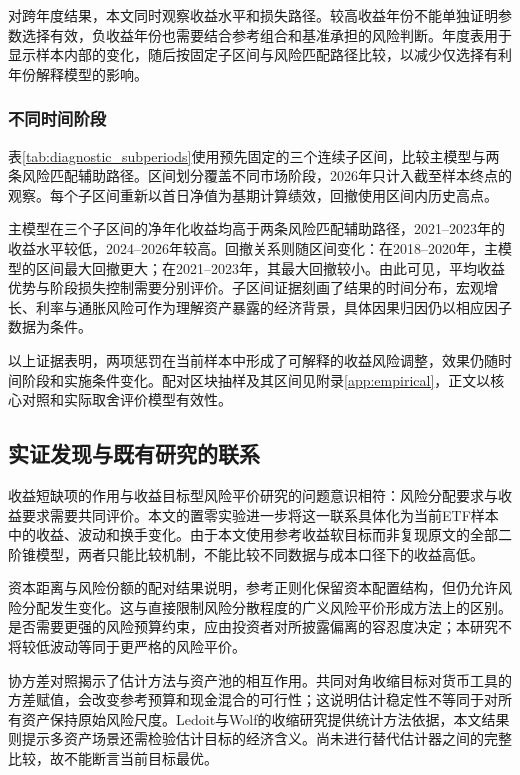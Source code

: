 对跨年度结果，本文同时观察收益水平和损失路径。较高收益年份不能单独证明参数选择有效，负收益年份也需要结合参考组合和基准承担的风险判断。年度表用于显示样本内部的变化，随后按固定子区间与风险匹配路径比较，以减少仅选择有利年份解释模型的影响。

\subsubsection{不同时间阶段}
表\ref{tab:diagnostic_subperiods}使用预先固定的三个连续子区间，比较主模型与两条风险匹配辅助路径。区间划分覆盖不同市场阶段，2026年只计入截至样本终点的观察。每个子区间重新以首日净值为基期计算绩效，回撤使用区间内历史高点。

\begin{table}[htbp]\centering
\caption{固定子区间中的收益、夏普与回撤}\label{tab:diagnostic_subperiods}
\fitthesistable{}
\end{table}

主模型在三个子区间的净年化收益均高于两条风险匹配辅助路径，2021--2023年的收益水平较低，2024--2026年较高。回撤关系则随区间变化：在2018--2020年，主模型的区间最大回撤更大；在2021--2023年，其最大回撤较小。由此可见，平均收益优势与阶段损失控制需要分别评价。子区间证据刻画了结果的时间分布，宏观增长、利率与通胀风险可作为理解资产暴露的经济背景，具体因果归因仍以相应因子数据为条件。
\FloatBarrier


以上证据表明，两项惩罚在当前样本中形成了可解释的收益风险调整，效果仍随时间阶段和实施条件变化。配对区块抽样及其区间见附录\ref{app:empirical}，正文以核心对照和实际取舍评价模型有效性。

\subsection{实证发现与既有研究的联系}
收益短缺项的作用与收益目标型风险平价研究的问题意识相符\cite{gambeta2020risk}：风险分配要求与收益要求需要共同评价。本文的置零实验进一步将这一联系具体化为当前ETF样本中的收益、波动和换手变化。由于本文使用参考收益软目标而非复现原文的全部二阶锥模型，两者只能比较机制，不能比较不同数据与成本口径下的收益高低。

资本距离与风险份额的配对结果说明，参考正则化保留资本配置结构，但仍允许风险分配发生变化。这与直接限制风险分散程度的广义风险平价形成方法上的区别\cite{costa2020generalized}。是否需要更强的风险预算约束，应由投资者对所披露偏离的容忍度决定；本研究不将较低波动等同于更严格的风险平价。

协方差对照揭示了估计方法与资产池的相互作用。共同对角收缩目标对货币工具的方差赋值，会改变参考预算和现金混合的可行性；这说明估计稳定性不等同于对所有资产保持原始风险尺度。Ledoit与Wolf的收缩研究提供统计方法依据\cite{ledoit2004well,ledoit2022quadratic}，本文结果则提示多资产场景还需检验估计目标的经济含义。尚未进行替代估计器之间的完整比较，故不能断言当前目标最优。

